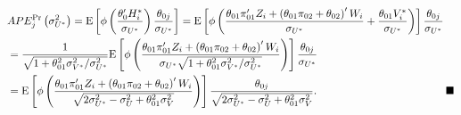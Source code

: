 \documentclass[11pt]{article}
\begin{document}
\begin{align*}
& APE_{j}^{\text{Pr}}\left( \sigma _{U^{\ast }}^{2}\right) =\mathrm{E}\left[
\phi \left( \frac{\theta _{0}^{\prime }H_{i}^{\ast }}{\sigma _{U^{\ast }}}%
\right) \frac{\theta _{0j}}{\sigma _{U^{\ast }}}\right] =\mathrm{E}\left[
\phi \left( \frac{\theta _{01}\pi _{01}^{\prime }Z_{i}+\left( \theta
_{01}\pi _{02}+\theta _{02}\right) ^{\prime }W_{i}}{\sigma _{U^{\ast }}}+%
\frac{\theta _{01}V_{i}^{\ast }}{\sigma _{U^{\ast }}}\right) \right] \frac{%
\theta _{0j}}{\sigma _{U^{\ast }}} \\
& =\frac{1}{\sqrt{1+\theta _{01}^{2}\sigma _{V^{\ast }}^{2}/\sigma _{U^{\ast
}}^{2}}}\mathrm{E}\left[ \phi \left( \frac{\theta _{01}\pi _{01}^{\prime
}Z_{i}+\left( \theta _{01}\pi _{02}+\theta _{02}\right) ^{\prime }W_{i}}{%
\sigma _{U^{\ast }}\sqrt{1+\theta _{01}^{2}\sigma _{V^{\ast }}^{2}/\sigma
_{U^{\ast }}^{2}}}\right) \right] \frac{\theta _{0j}}{\sigma _{U^{\ast }}} \\
& ={}\mathrm{E}\left[ \phi
\left( \frac{\theta _{01}\pi _{01}^{\prime }Z_{i}+\left( \theta _{01}\pi
_{02}+\theta _{02}\right) ^{\prime }W_{i}}{\sqrt{2\sigma _{U^{\ast
}}^{2}-\sigma _{U}^{2}+\theta _{01}^{2}\sigma _{V}^{2}}}\right) \right] 
\frac{\theta _{0j}}{\sqrt{2\sigma _{U^{\ast }}^{2}-\sigma _{U}^{2}+\theta
_{01}^{2}\sigma _{V}^{2}}}.\qquad \qquad \qquad \qquad \qquad \qquad
\blacksquare
\end{align*}
\end{document}
